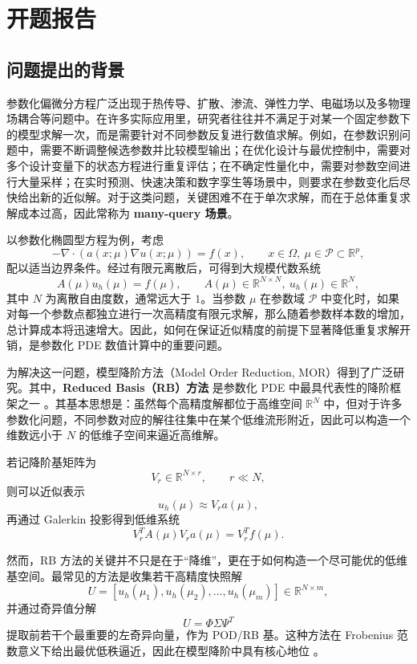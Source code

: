 \section{开题报告}

\subsection{问题提出的背景}

参数化偏微分方程广泛出现于热传导、扩散、渗流、弹性力学、电磁场以及多物理场耦合等问题中。在许多实际应用里，研究者往往并不满足于对某一个固定参数下的模型求解一次，而是需要针对不同参数反复进行数值求解。例如，在参数识别问题中，需要不断调整候选参数并比较模型输出；在优化设计与最优控制中，需要对多个设计变量下的状态方程进行重复评估；在不确定性量化中，需要对参数空间进行大量采样；在实时预测、快速决策和数字孪生等场景中，则要求在参数变化后尽快给出新的近似解。对于这类问题，关键困难不在于单次求解，而在于总体重复求解成本过高，因此常称为 \textbf{many-query 场景}。

以参数化椭圆型方程为例，考虑
\[
-\nabla\cdot(a(x;\mu)\nabla u(x;\mu))=f(x),\qquad x\in\Omega,\ \mu\in\mathcal P\subset\mathbb R^p,
\]
配以适当边界条件。经过有限元离散后，可得到大规模代数系统
\[
A(\mu)u_h(\mu)=f(\mu),\qquad A(\mu)\in\mathbb R^{N\times N},\ u_h(\mu)\in\mathbb R^N,
\]
其中 $N$ 为离散自由度数，通常远大于 $1$。当参数 $\mu$ 在参数域 $\mathcal P$ 中变化时，如果对每一个参数点都独立进行一次高精度有限元求解，那么随着参数样本数的增加，总计算成本将迅速增大。因此，如何在保证近似精度的前提下显著降低重复求解开销，是参数化 PDE 数值计算中的重要问题。

为解决这一问题，模型降阶方法（Model Order Reduction, MOR）得到了广泛研究。其中，\textbf{Reduced Basis（RB）方法} 是参数化 PDE 中最具代表性的降阶框架之一 \cite{hesthaven2015,quarteroni2016,patera_rozza}。其基本思想是：虽然每个高精度解都位于高维空间 $\mathbb R^N$ 中，但对于许多参数化问题，不同参数对应的解往往集中在某个低维流形附近，因此可以构造一个维数远小于 $N$ 的低维子空间来逼近高维解。

若记降阶基矩阵为
\[
V_r\in\mathbb R^{N\times r},\qquad r\ll N,
\]
则可以近似表示
\[
u_h(\mu)\approx V_r a(\mu),
\]
再通过 Galerkin 投影得到低维系统
\[
V_r^T A(\mu)V_r a(\mu)=V_r^T f(\mu).
\]

然而，RB 方法的关键并不只是在于“降维”，更在于如何构造一个尽可能优的低维基空间。最常见的方法是收集若干高精度快照解
\[
U=[u_h(\mu_1),u_h(\mu_2),\dots,u_h(\mu_m)]\in\mathbb R^{N\times m},
\]
并通过奇异值分解
\[
U=\Phi\Sigma\Psi^T
\]
提取前若干个最重要的左奇异向量，作为 POD/RB 基。这种方法在 Frobenius 范数意义下给出最优低秩逼近，因此在模型降阶中具有核心地位 \cite{kunisch2002,trefethen1997}。

